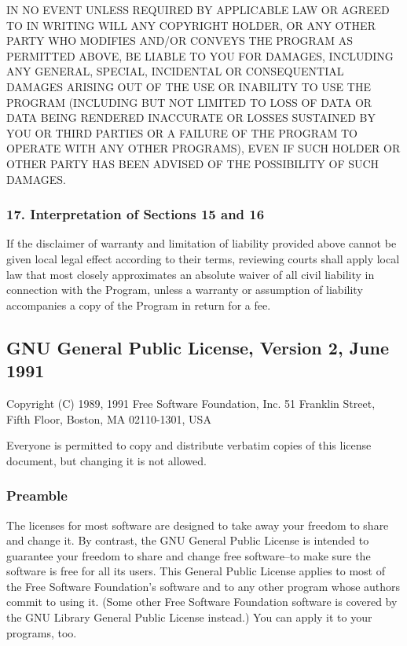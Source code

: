 \documentclass[a4paper, 11pt, twoside]{article}
\begin{document}
IN NO EVENT UNLESS REQUIRED BY APPLICABLE LAW OR AGREED TO IN WRITING WILL ANY COPYRIGHT HOLDER, OR ANY OTHER PARTY WHO MODIFIES AND/OR CONVEYS THE PROGRAM AS PERMITTED ABOVE, BE LIABLE TO YOU FOR DAMAGES, INCLUDING ANY GENERAL, SPECIAL, INCIDENTAL OR CONSEQUENTIAL DAMAGES ARISING OUT OF THE USE OR INABILITY TO USE THE PROGRAM (INCLUDING BUT NOT LIMITED TO LOSS OF DATA OR DATA BEING RENDERED INACCURATE OR LOSSES SUSTAINED BY YOU OR THIRD PARTIES OR A FAILURE OF THE PROGRAM TO OPERATE WITH ANY OTHER PROGRAMS), EVEN IF SUCH HOLDER OR OTHER PARTY HAS BEEN ADVISED OF THE POSSIBILITY OF SUCH DAMAGES.

\subsubsection{17. Interpretation of Sections 15 and 16}

If the disclaimer of warranty and limitation of liability provided above cannot be given local legal effect according to their terms, reviewing courts shall apply local law that most closely approximates an absolute waiver of all civil liability in connection with the Program, unless a warranty or assumption of liability accompanies a copy of the Program in return for a fee.

\subsection{GNU General Public License, Version 2, June 1991}

Copyright (C) 1989, 1991 Free Software Foundation, Inc. 51 Franklin Street, Fifth Floor, Boston, MA  02110-1301, USA

Everyone is permitted to copy and distribute verbatim copies of this license document, but changing it is not allowed.

\subsubsection{Preamble}

The licenses for most software are designed to take away your freedom to share and change it. By contrast, the GNU General Public License is intended to guarantee your freedom to share and change free software--to make sure the software is free for all its users. This General Public License applies to most of the Free Software Foundation's software and to any other program whose authors commit to using it. (Some other Free Software Foundation software is covered by the GNU Library General Public License instead.) You can apply it to your programs, too.
\end{document}
